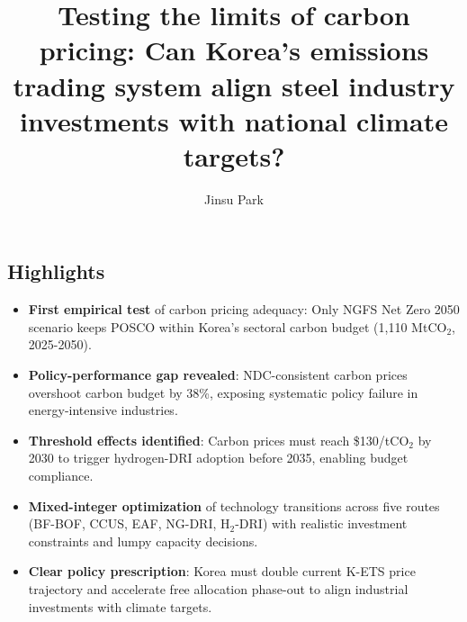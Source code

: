\documentclass[preprint,5p,authoryear]{elsarticle}
\begin{document}
\begin{frontmatter}
\title{Testing the limits of carbon pricing: Can Korea's emissions trading system align steel industry investments with national climate targets?}

\author[planit]{Jinsu Park}
\address[planit]{PLANiT Institute, Seoul, Republic of Korea}


\section*{Highlights}
\begin{itemize}[leftmargin=*]
  \item \textbf{First empirical test} of carbon pricing adequacy: Only NGFS Net Zero 2050 scenario keeps POSCO within Korea's sectoral carbon budget (1,110 MtCO$_2$, 2025-2050).
  \item \textbf{Policy-performance gap revealed}: NDC-consistent carbon prices overshoot carbon budget by 38\%, exposing systematic policy failure in energy-intensive industries.
  \item \textbf{Threshold effects identified}: Carbon prices must reach \$130/tCO$_2$ by 2030 to trigger hydrogen-DRI adoption before 2035, enabling budget compliance.
  \item \textbf{Mixed-integer optimization} of technology transitions across five routes (BF-BOF, CCUS, EAF, NG-DRI, H$_2$-DRI) with realistic investment constraints and lumpy capacity decisions.
  \item \textbf{Clear policy prescription}: Korea must double current K-ETS price trajectory and accelerate free allocation phase-out to align industrial investments with climate targets.
\end{itemize}


\end{frontmatter}
\end{document}
